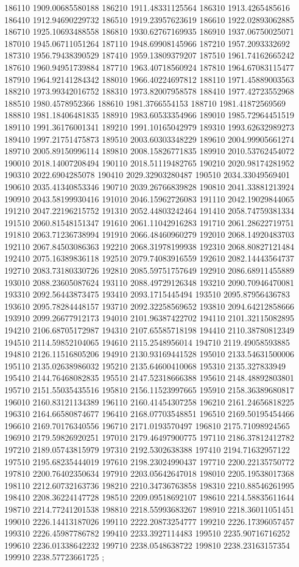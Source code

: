 {186110 1909.00685580188
186210 1911.48331125564
186310 1913.4265485616
186410 1912.94690229732
186510 1919.23957623619
186610 1922.02893062885
186710 1925.10693488558
186810 1930.62767169935
186910 1937.06750025071
187010 1945.06711051264
187110 1948.69908145966
187210 1957.2093332692
187310 1956.79438390529
187410 1959.13809379207
187510 1961.74162665242
187610 1960.94951739884
187710 1963.40718560924
187810 1964.67083115477
187910 1964.92141284342
188010 1966.40224697812
188110 1971.45889003563
188210 1973.99342016752
188310 1973.82007958578
188410 1977.42723552968
188510 1980.4578952366
188610 1981.3766554153
188710 1981.41872569569
188810 1981.18406481835
188910 1983.60533354966
189010 1985.72964451519
189110 1991.36176001341
189210 1991.10165042979
189310 1993.62632989273
189410 1997.21751475873
189510 2003.60303348229
189610 2004.99905661274
189710 2005.89150996114
189810 2008.15826771835
189910 2010.53762454072
190010 2018.14007208494
190110 2018.51119482765
190210 2020.98174281952
190310 2022.6904285078
190410 2029.32903280487
190510 2034.33049569401
190610 2035.41340853346
190710 2039.26766839828
190810 2041.33881213924
190910 2043.58199930416
191010 2046.15962726083
191110 2042.19029844065
191210 2047.22196215752
191310 2052.44803242464
191410 2058.74759381334
191510 2060.81548151347
191610 2061.11042916283
191710 2061.28622719751
191810 2063.71236738994
191910 2066.48460960279
192010 2068.14920483703
192110 2067.84503086363
192210 2068.31978199938
192310 2068.80827121484
192410 2075.16389836118
192510 2079.74083916559
192610 2082.14443564737
192710 2083.73180330726
192810 2085.59751757649
192910 2086.68911455889
193010 2088.23605087624
193110 2088.49729126348
193210 2090.70946470081
193310 2092.56443873475
193410 2093.1715445494
193510 2095.87956436783
193610 2095.78284448157
193710 2092.32258569652
193810 2094.64212858666
193910 2099.26677912173
194010 2101.96387422702
194110 2101.32115082895
194210 2106.68705172987
194310 2107.65585718198
194410 2110.38780812349
194510 2114.59852104065
194610 2115.2548956014
194710 2119.49058593885
194810 2126.11516805206
194910 2130.93169441528
195010 2133.54631500006
195110 2135.02638986032
195210 2135.64600410068
195310 2135.327833949
195410 2144.76468082835
195510 2147.52318666388
195610 2148.48892803801
195710 2151.55035435516
195810 2156.11523997665
195910 2158.36389680817
196010 2160.83121134389
196110 2160.41454307258
196210 2161.24656818225
196310 2164.66580874677
196410 2168.07703548851
196510 2169.50195454466
196610 2169.70176340556
196710 2171.0193570497
196810 2175.71098924565
196910 2179.59826920251
197010 2179.46497900775
197110 2186.37812412782
197210 2189.05743815979
197310 2192.5302638388
197410 2194.71632957122
197510 2195.68235444019
197610 2198.23024990437
197710 2200.22135750772
197810 2200.76402350634
197910 2203.05642647018
198010 2205.19538017368
198110 2212.60732163736
198210 2210.34736763858
198310 2210.88546261995
198410 2208.36224147728
198510 2209.09518692107
198610 2214.58835611644
198710 2214.77241201538
198810 2218.55993683267
198910 2218.36011051451
199010 2226.14413187026
199110 2222.20873254777
199210 2226.17396057457
199310 2226.45987786782
199410 2233.3927114483
199510 2235.90716716252
199610 2236.01338642232
199710 2238.0548638722
199810 2238.23163157354
199910 2238.57723661725
};

